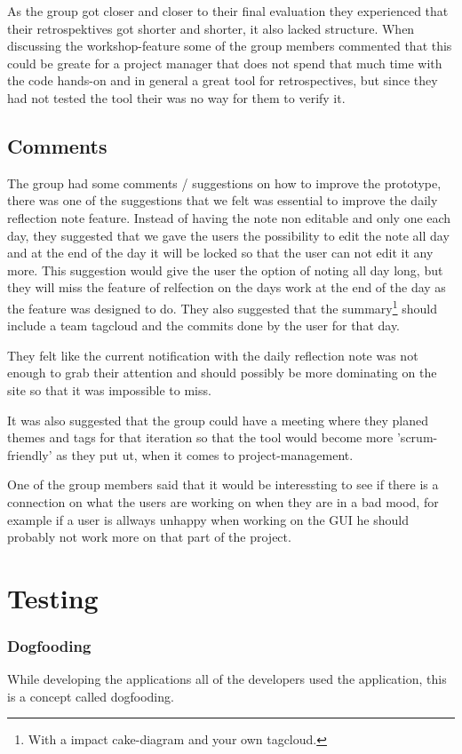 As the group got closer and closer to their final evaluation they experienced that their retrospektives got shorter and shorter, it also lacked structure. When discussing the workshop-feature some of the group members commented that this could be greate for a project manager that does not spend that much time with the code hands-on and in general a great tool for retrospectives, but since they had not tested the tool their was no way for them to verify it.

\subsection{Comments}
The group had some comments / suggestions on how to improve the prototype, there was one of the suggestions that we felt was essential to improve the daily reflection note feature. Instead of having the note non editable and only one each day, they suggested that we gave the users the possibility to edit the note all day and at the end of the day it will be locked so that the user can not edit it any more. This suggestion would give the user the option of noting all day long, but they will miss the feature of relfection on the days work at the end of the day as the feature was designed to do. They also suggested that the summary\footnote{With a impact cake-diagram and your own tagcloud.} should include a team tagcloud and the commits done by the user for that day.

They felt like the current notification with the daily reflection note was not enough to grab their attention and should possibly be more dominating on the site so that it was impossible to miss.

It was also suggested that the group could have a meeting where they planed themes and tags for that iteration so that the tool would become more 'scrum-friendly' as they put ut, when it comes to project-management. 

One of the group members said that it would be interessting to see if there is a connection on what the users are working on when they are in a bad mood, for example if a user is allways unhappy when working on the GUI he should probably not work more on that part of the project.

\section{Testing}
\subsubsection{Dogfooding}
While developing the applications all of the developers used the application, this is a concept called dogfooding.

